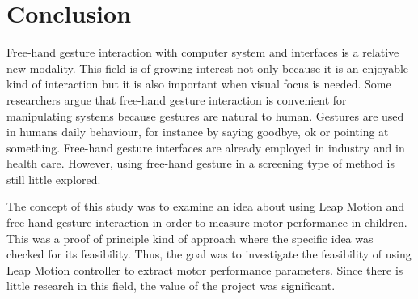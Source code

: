 \chapter{Conclusion}
\label{chap:conclusion}




Free-hand gesture interaction with computer system and interfaces is a relative new modality. This field is of growing interest not only because it is an enjoyable kind of interaction but it is also important when visual focus is needed. Some researchers argue that free-hand gesture interaction is convenient for manipulating systems because gestures are natural to human. Gestures are used in humans daily behaviour, for instance by saying goodbye, ok or pointing at something. 
Free-hand gesture interfaces are already employed in industry and in health care. However, using free-hand gesture in a screening type of method is still little explored.

The concept of this study was to examine an idea about using Leap Motion and free-hand gesture interaction in order to measure motor performance in children. This was a proof of principle kind of approach where the specific idea was checked for its feasibility. Thus, the goal was to investigate the feasibility of using Leap Motion controller to extract motor performance parameters. Since there is little research in this field, the value of the project was significant.


